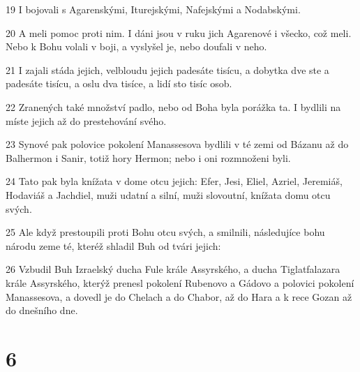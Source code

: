 \par 19 I bojovali s Agarenskými, Iturejskými, Nafejskými a Nodabskými.
\par 20 A meli pomoc proti nim. I dáni jsou v ruku jich Agarenové i všecko, což meli. Nebo k Bohu volali v boji, a vyslyšel je, nebo doufali v neho.
\par 21 I zajali stáda jejich, velbloudu jejich padesáte tisícu, a dobytka dve ste a padesáte tisícu, a oslu dva tisíce, a lidí sto tisíc osob.
\par 22 Zranených také množství padlo, nebo od Boha byla porážka ta. I bydlili na míste jejich až do prestehování svého.
\par 23 Synové pak polovice pokolení Manassesova bydlili v té zemi od Bázanu až do Balhermon i Sanir, totiž hory Hermon; nebo i oni rozmnoženi byli.
\par 24 Tato pak byla knížata v dome otcu jejich: Efer, Jesi, Eliel, Azriel, Jeremiáš, Hodaviáš a Jachdiel, muži udatní a silní, muži slovoutní, knížata domu otcu svých.
\par 25 Ale když prestoupili proti Bohu otcu svých, a smilnili, následujíce bohu národu zeme té, kteréž shladil Buh od tvári jejich:
\par 26 Vzbudil Buh Izraelský ducha Fule krále Assyrského, a ducha Tiglatfalazara krále Assyrského, kterýž prenesl pokolení Rubenovo a Gádovo a polovici pokolení Manassesova, a dovedl je do Chelach a do Chabor, až do Hara a k rece Gozan až do dnešního dne.

\chapter{6}

